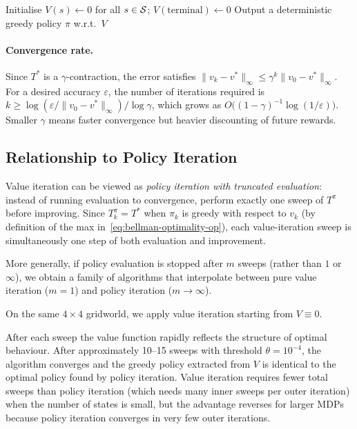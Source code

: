 \begin{algorithm}[ht]
\caption{Value Iteration}
\label{alg:value-iteration}
Initialise $V(s) \leftarrow 0$ for all $s \in \mathcal{S}$; $V(\text{terminal}) \leftarrow 0$\;
Output a deterministic greedy policy $\pi$ w.r.t.\ $V$\;
\end{algorithm}

\paragraph{Convergence rate.}
Since $T^*$ is a $\gamma$-contraction, the error satisfies $\|v_k - v^*\|_\infty \le \gamma^k \|v_0 - v^*\|_\infty$.  For a desired accuracy $\varepsilon$, the number of iterations required is $k \ge \log(\varepsilon / \|v_0 - v^*\|_\infty) / \log \gamma$, which grows as $O\!\bigl((1-\gamma)^{-1}\log(1/\varepsilon)\bigr)$.  Smaller $\gamma$ means faster convergence but heavier discounting of future rewards.

\subsection*{Relationship to Policy Iteration}

Value iteration can be viewed as \emph{policy iteration with truncated evaluation}: instead of running evaluation to convergence, perform exactly one sweep of $T^\pi$ before improving.  Since $T^\pi_k = T^*$ when $\pi_k$ is greedy with respect to $v_k$ (by definition of the max in~\eqref{eq:bellman-optimality-op}), each value-iteration sweep is simultaneously one step of both evaluation and improvement.

More generally, if policy evaluation is stopped after $m$ sweeps (rather than $1$ or $\infty$), we obtain a family of algorithms that interpolate between pure value iteration ($m=1$) and policy iteration ($m \to \infty$).

\begin{example}
\label{ex:vi-gridworld}
On the same $4\times4$ gridworld, we apply value iteration starting from $V \equiv 0$.

After each sweep the value function rapidly reflects the structure of optimal behaviour.  After approximately 10--15 sweeps with threshold $\theta = 10^{-4}$, the algorithm converges and the greedy policy extracted from $V$ is identical to the optimal policy found by policy iteration.  Value iteration requires fewer total sweeps than policy iteration (which needs many inner sweeps per outer iteration) when the number of states is small, but the advantage reverses for larger MDPs because policy iteration converges in very few outer iterations.
\end{example}

